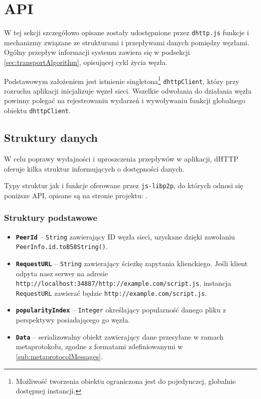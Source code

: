 \section{API}
\label{sec:api}

W tej sekcji szczegółowo opisane zostały udostępnione przez \texttt{dhttp.js} funkcje i mechanizmy związane ze strukturami i przepływami danych pomiędzy węzłami. Ogólny przepływ informacji systemu zawiera się w podsekcji \ref{sec:transportAlgorithm}, opisującej cykl życia węzła.

Podstawowym założeniem jest istnienie singletona\footnote{Możliwość tworzenia obiektu ograniczona jest do pojedynczej, globalnie dostępnej instancji.} \texttt{dhttpClient}, który przy rozruchu aplikacji inicjalizuje węzeł sieci. Wszelkie odwołania do działania węzła powinny polegać na rejestrowaniu wydarzeń i wywoływaniu funkcji globalnego obiektu \texttt{dhttpClient}.

\subsection{Struktury danych}
W celu poprawy wydajności i uproszczenia przepływów w aplikacji, dHTTP oferuje kilka struktur informujących o dostępności danych.

Typy struktur jak i funkcje oferowane przez \texttt{js-libp2p}, do których odnosi się poniższe API, opisane są na stronie projektu: \cite{libp2pReadme}.

\subsubsection{Struktury podstawowe}
\begin{itemize}
    \item \textbf{\texttt{PeerId}} -- \texttt{String} zawierający ID węzła sieci, uzyskane dzięki zawołaniu \texttt{PeerInfo.id.toB58String()}.
    \item \textbf{\texttt{RequestURL}} -- \texttt{String} zawierający ścieżkę zapytania klienckiego. Jeśli klient odpyta nasz serwer na adresie \texttt{http://localhost:34887/http://example.com/script.js}, instancja \texttt{RequestURL} zawierać będzie \texttt{http://example.com/script.js}.
    \item \textbf{\texttt{popularityIndex}} -- \texttt{Integer} określający popularność danego pliku z perspektywy posiadającego go węzła.
    \item \textbf{\texttt{Data}} -- serializowalny obiekt zawierający dane przesyłane w ramach metaprotokołu, zgodne z formatami zdefiniowanymi w \ref{sub:metaprotocolMessages}.
\end{itemize}

